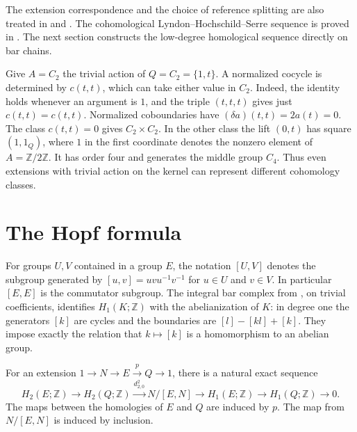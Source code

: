 The extension correspondence and the choice of reference
splitting are also treated in \cite{conrad-extensions} and
\cite[Theorems 23.3 and 24.3]{lassueur}. The cohomological
Lyndon--Hochschild--Serre sequence is proved in
\cite[A05]{homalg}. The next section constructs the low-degree
homological sequence directly on bar chains.

\begin{example}
\label{ex:gr02-c2-extensions}
Give \(A=C_2\) the trivial action of \(Q=C_2=\{1,t\}\).
A normalized cocycle is determined by \(c(t,t)\), which can
take either value in \(C_2\). Indeed, the identity holds whenever
an argument is \(1\), and the triple \((t,t,t)\) gives just
\(c(t,t)=c(t,t)\). Normalized coboundaries have
\((\delta a)(t,t)=2a(t)=0\). The class \(c(t,t)=0\) gives
\(C_2\times C_2\). In the other class the lift \((0,t)\) has
square \((1,1_Q)\), where \(1\) in the first coordinate denotes
the nonzero element of \(A=\mathbb Z/2\mathbb Z\).
It has order four and generates the middle group \(C_4\).
Thus even extensions with trivial action on the kernel can
represent different cohomology classes.
\end{example}

\section{The Hopf formula}

For groups \(U,V\) contained in a group \(E\), the notation
\([U,V]\) denotes the subgroup generated by
\([u,v]=uvu^{-1}v^{-1}\) for \(u\in U\) and \(v\in V\).
In particular \([E,E]\) is the commutator subgroup. The integral
bar complex from \cite[A10]{homalg}, on trivial coefficients,
identifies \(H_1(K;\mathbb Z)\) with the abelianization of \(K\):
in degree one the generators \([k]\) are cycles and the
boundaries are \([l]-[kl]+[k]\). They impose exactly the relation
that \(k\mapsto[k]\) is a homomorphism to an abelian group.

\begin{proposition}
\label{prop:gr02-homological-five-term}
For an extension \(1\to N\to E\xrightarrow{p}Q\to 1\), there is
a natural exact sequence
\[
 H_2(E;\mathbb Z)\longrightarrow H_2(Q;\mathbb Z)
 \xrightarrow{d^2_{2,0}}N/[E,N]\longrightarrow
 H_1(E;\mathbb Z)\longrightarrow H_1(Q;\mathbb Z)\longrightarrow 0.
\]
The maps between the homologies of \(E\) and \(Q\) are induced by
\(p\). The map from \(N/[E,N]\) is induced by inclusion.
\end{proposition}

